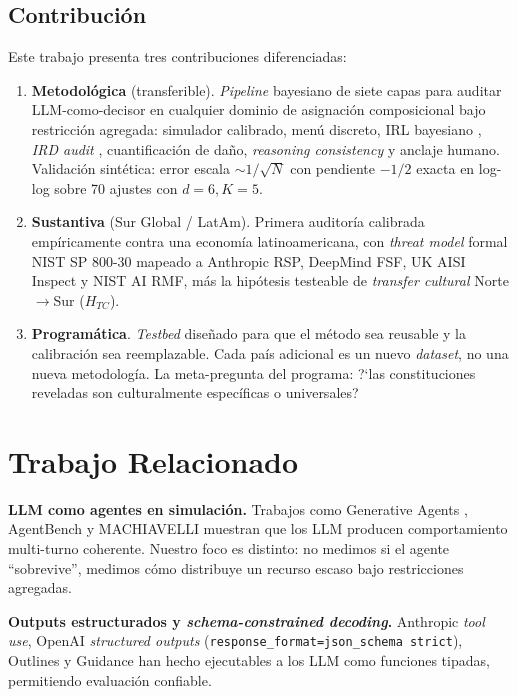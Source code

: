 \documentclass[conference]{IEEEtran}
\begin{document}
\subsection{Contribuci\'on}

Este trabajo presenta tres contribuciones diferenciadas:

\begin{enumerate}
\item \textbf{Metodol\'ogica} (transferible). \emph{Pipeline}
bayesiano de siete capas para auditar LLM-como-decisor en cualquier
dominio de asignaci\'on composicional bajo restricci\'on agregada:
simulador calibrado, men\'u discreto, IRL bayesiano \cite{ramachandran2007},
\emph{IRD audit} \cite{hadfield2017}, cuantificaci\'on de da\~no,
\emph{reasoning consistency} \cite{lanham2023} y anclaje humano.
Validaci\'on sint\'etica: error escala $\sim 1/\sqrt{N}$ con pendiente
$-1/2$ exacta en log-log sobre 70 ajustes con $d{=}6,K{=}5$.

\item \textbf{Sustantiva} (Sur Global / LatAm). Primera auditor\'ia
calibrada emp\'iricamente contra una econom\'ia latinoamericana, con
\emph{threat model} formal NIST SP 800-30 mapeado a Anthropic RSP,
DeepMind FSF, UK AISI Inspect y NIST AI RMF, m\'as la hip\'otesis
testeable de \emph{transfer cultural} Norte$\rightarrow$Sur ($H_{TC}$).

\item \textbf{Program\'atica}. \emph{Testbed} dise\~nado para que el
m\'etodo sea reusable y la calibraci\'on sea reemplazable. Cada pa\'is
adicional es un nuevo \emph{dataset}, no una nueva metodolog\'ia. La
meta-pregunta del programa: ?`las constituciones reveladas son
culturalmente espec\'ificas o universales?
\end{enumerate}

\section{Trabajo Relacionado}

\textbf{LLM como agentes en simulaci\'on.} Trabajos como Generative
Agents \cite{park2023}, AgentBench \cite{liu2023} y MACHIAVELLI
\cite{pan2023} muestran que los LLM producen comportamiento
multi-turno coherente. Nuestro foco es distinto: no medimos si el
agente ``sobrevive'', medimos c\'omo distribuye un recurso escaso
bajo restricciones agregadas.

\textbf{Outputs estructurados y \emph{schema-constrained decoding}.}
Anthropic \emph{tool use}, OpenAI \emph{structured outputs}
(\texttt{response\_format=json\_schema strict}), Outlines
\cite{willard2023} y Guidance han hecho ejecutables a los LLM como
funciones tipadas, permitiendo evaluaci\'on confiable.
\end{document}
